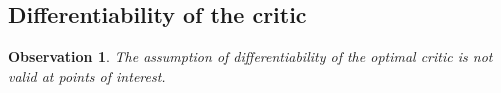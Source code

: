 \documentclass{article} %
\newtheorem{observation}{Observation}
\begin{document}

%
%


\subsection{Differentiability of the critic}\label{sct:diffCritic}

\begin{observation}
The assumption of differentiability of the optimal critic is not valid at points of interest.
\end{observation}
\end{document}
